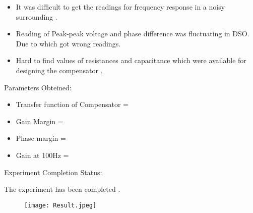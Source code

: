 \documentclass[12pt]{report}
\begin{document}

\begin{itemize}
\item It was difficult to get the readings for frequency response in a noisy
surrounding .
\item Reading of Peak-peak voltage and phase difference was fluctuating in DSO.
 Due to which got wrong readings.

\item Hard to find values of resistances and capacitance which were available for designing the compensator .
\end{itemize} 

\vspace{20pt}
\begin{Large}
Parameters Obteined: \\
\end{Large}
\begin{itemize}
    \item Transfer function of Compensator = 
    \item Gain Margin = 
    \item Phase margin = 
    \item Gain at 100Hz = 
\end{itemize}

\newpage
\begin{Large}
Experiment Completion Status:\\
\end{Large}

The experiment has been completed .\\

\begin{figure}[h!]
\center
\texttt{[image: Result.jpeg]}
\end{figure}
\end{document}

